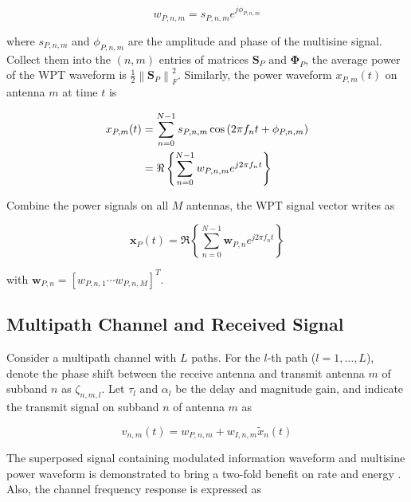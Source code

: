 \begin{equation}\label{eqn:unmodulated}
  {w_{P,n,m}} = {s_{P,n,m}}{e^{j{\phi _{P,n,m}}}}
\end{equation}

where ${s_{P,n,m}}$ and ${{\phi _{P,n,m}}}$ are the amplitude and phase of the multisine signal. Collect them into the $(n,m)$ entries of matrices ${{\mathbf{S}}_P}$ and ${{\mathbf{\Phi }}_P}$, the average power of the WPT waveform is $\frac{1}{2}\left\|\mathbf{S}_{P}\right\|_{F}^{2}$. Similarly, the power waveform ${x_{P,m}}(t)$ on antenna $m$ at time $t$ is

\begin{align}\label{eqn:power_waveform}
  {x_{P,m}}(t) &= \sum\limits_{n = 0}^{N - 1} {{s_{P,n,m}}\cos \left( {2\pi {f_n}t + {\phi _{P,n,m}}} \right)}  \hfill \\
   &= \Re \left\{ {\sum\limits_{n = 0}^{N - 1} {{w_{P,n,m}}{e^{j2\pi {f_n}t}}} } \right\} \hfill
\end{align}

Combine the power signals on all $M$ antennas, the WPT signal vector writes as

\begin{equation}\label{eqn:wpt_vector}
  {{\mathbf{x}}_P}(t) = \Re \left\{ {\sum\limits_{n = 0}^{N - 1} {{{\mathbf{w}}_{P,n}}} {e^{j2\pi {f_n}t}}} \right\}
\end{equation}

with ${{\mathbf{w}}_{P,n}} = {\left[ {{w_{P,n,1}} \cdots {w_{P,n,M}}} \right]^T}$.



\subsection{Multipath Channel and Received Signal}\label{sec:multipath-and-received-signal}
Consider a multipath channel with $L$ paths. For the $l$-th path ($l = 1, \ldots ,L$), denote the phase shift between the receive antenna and transmit antenna $m$ of subband $n$ as ${\zeta _{n,m,l}}$. Let ${\tau _l}$ and ${\alpha _l}$ be the delay and magnitude gain, and indicate the transmit signal on subband $n$ of antenna $m$ as

\begin{equation}\label{eqn:superposed_waveform}
  {v_{n,m}}(t) = {w_{P,n,m}} + {w_{I,n,m}}{{\tilde x}_n}(t)
\end{equation}

The superposed signal containing modulated information waveform and multisine power waveform is demonstrated to bring a two-fold benefit on rate and energy \cite{Clerckx2019}. Also, the channel frequency response is expressed as

